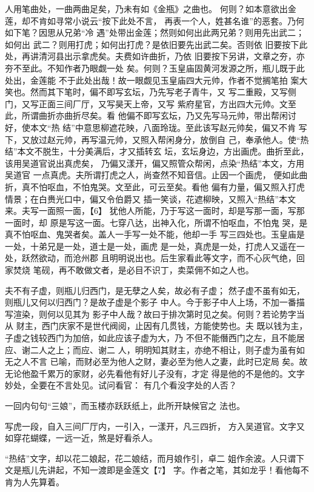 \documentclass[UTF8,scheme=chinese,11pt,linespread=1.4]{ctexbook}
\makeatletter
\newenvironment{diben}[1]
  {\list{}{\listparindent 2em
    \itemindent\listparindent
    \rightmargin 0em  %
    \leftmargin 0em  %
    \parsep \z@ \@plus\p@}%
   \item\relax}
  {\endlist}
\makeatother
\begin{document}
\begin{diben}
凡人用笔曲处，一曲两曲足矣，乃未有如《金瓶》之曲也。
何则？如本意欲出金莲，却不肯如寻常小说云“按下此处不言，
再表一个人，姓甚名谁”的恶套。乃何如下笔？因思从兄弟“冷
遇”处带出金莲；然则如何出此两兄弟？则用先出武二；如何出
武二？则用打虎；如何出打虎？是依旧要先出武二矣。否则依
旧要按下此处，再讲清河县出示拿虎矣。夫费如许曲折，乃依
旧要按下另讲，文章之夯，亦夯不至此。不知作者乃眼觑一处
矣。何则？玉皇庙固黄河发源之所，瓶儿既于此处出，金莲能
不于此处出哉！故一眼觑见玉皇庙四大元帅，作者不觉搁笔拍
案大笑也。然而其下笔时，偏不即写玄坛，乃先写老子青牛，又
写二重殿，又写侧门，又写正面三间厂厅，又写昊天上帝，又写
紫府星官，方出四大元帅。文至此，所谓曲折亦曲折尽矣。看
他偏不即写玄坛，乃又先写马元帅，带出帮闲讨好，使本文“热
结”中意思柳遮花映，八面玲珑。至此该写赵元帅矣，偏又不肯
写下，又放过赵元帅，再写温元帅，又照入帮闲身分，放倒自
己，奉承他人。使“热结”本文不脱生，十分美满后，才又插转玄
坛，玄坛身边，方出画虎。曲折至此，该用吴道官说出真虎矣，
乃偏又漾开，偏又照管众帮闲，点染“热结”本文，方用吴道官
一点真虎。夫所谓打虎之人，尚查然不知音信。止因一个画虎，
便如此曲折，真不怕呕血，不怕鬼哭。文至此，可云至矣。看他
偏有力量，偏又照入打虎情景；在白赉光口中，偏又令伯爵又
插一笑谈，花遮柳映，又照入“热结”本文来。夫写一面照一面，【6】
犹他人所能，乃于写这一面时，却是写那一面，写那一面时，却
原是写这一面。七穿八达，出神入化，所谓不怕呕血，不怕鬼
哭，是真不怕呕血、鬼哭者矣。盖人一手写一处不能，他却一手
写三四处也。玉皇庙是一处，十弟兄是一处，道士是一处，画虎
是一处，真虎是一处，打虎人又遥在一处，跃然欲动，而沧州郡
且明明说出也。后生家看此等文字，而不心灰气绝，回家焚烧
笔砚，再不敢做文者，是必目不识丁，卖菜佣不如之人也。

夫不有子虚，则瓶儿归西门，是无孽之人矣，故必有子虚；
然子虚不虽有如无，则瓶儿又何以归西门？是故子虚是个影子
中人。今于影子中人上场，不加一番描写渲染，则何以见其为
影子中人哉？故曰于排次第时见之矣。何则？若论势字当从
财主，西门庆家不是世代阀阅，止因有几贯钱，方能使势也。夫
既以钱为主，子虚之钱较西门为加倍，如此应该子虚为大，乃
不但不能僭西门之左，且不能居应、谢二人之上；而应、谢二
人，明明知其财主，亦绝不相让，则子虚为虽有如无之人不言
已喻，而财必至为他人之财，妻必至为他人之妻，此时已定局
矣。故无论他盈千累万的家财，必先看他有好儿子没有，才定
得是他的不是他的。文字妙处，全要在不言处见。试问看官：
有几个看没字处的人否？

一回内句句“三娘”，而玉楼亦跃跃纸上，此所开缺候官之
法也。

写虎一段，自入三间厂厅内，一引入，一漾开，凡三四折，
方入吴道官。文字又如穿花蝴蝶，一远一近，煞是好看杀人。

“热结”文字，却以花二娘起，花二娘结，而月娘作引，卓二
姐作余波。人只谓下文是瓶儿先讲起，不知一渡即是金莲文【7】
字。作者之笔，其如龙乎！看他每不肯为人先算着。


\end{diben}
\end{document}
